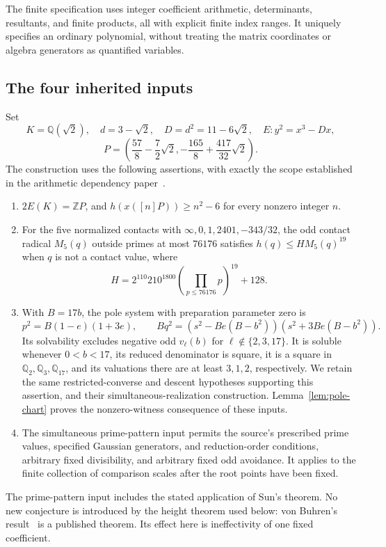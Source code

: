 \documentclass[11pt,a4paper]{article}
\newcommand{\Q}{\mathbb Q}\newcommand{\Z}{\mathbb Z}
\begin{document}
The finite specification uses integer coefficient arithmetic,
determinants, resultants, and finite
products, all with explicit finite index ranges. It uniquely
specifies an ordinary polynomial, without treating the matrix
coordinates or algebra generators as quantified variables.

\subsection{The four inherited inputs}\label{sec:inputs}

Set
\[
 K=\Q(\sqrt2),\quad d=3-\sqrt2,\quad D=d^2=11-6\sqrt2,
 \quad E:y^2=x^3-Dx,
\]
\[
 P=\left(\frac{57}{8}-\frac72\sqrt2,
          -\frac{165}{8}+\frac{417}{32}\sqrt2\right).
\]
The construction uses the following assertions, with exactly the
scope established in the arithmetic dependency paper~\cite{Dependencies}.
\begin{enumerate}
\item $2E(K)=\Z P$, and $h(x([n]P))\ge n^2-6$ for every
      nonzero integer $n$.
\item For the five normalized contacts with
      $\infty,0,1,2401,-343/32$, the odd contact radical
      $M_5(q)$ outside primes at most $76176$ satisfies
      $h(q)\le H M_5(q)^{19}$ when $q$ is not a contact value,
      where
\[
 H=2^{110}210^{1800}\left(\prod_{p\le76176}p\right)^{19}+128.
\]
\item With $B=17b$, the pole system with preparation parameter
      zero is
\[
 p^2=B(1-e)(1+3e),\qquad
 Bq^2=(s^2-Be(B-b^2))(s^2+3Be(B-b^2)).
\]
      Its solvability excludes negative odd $v_\ell(b)$ for
      $\ell\notin\{2,3,17\}$. It is soluble whenever
      $0<b<17$, its reduced denominator is square, it is a
      square in $\Q_2,\Q_3,\Q_{17}$, and its valuations there
      are at least $3,1,2$, respectively. We retain the same
      restricted-converse and descent hypotheses supporting this
      assertion, and their simultaneous-realization construction.
      Lemma~\ref{lem:pole-chart} proves the nonzero-witness
      consequence of these inputs.
\item The simultaneous prime-pattern input permits the source's
      prescribed prime values, specified Gaussian generators, and reduction-order
      conditions, arbitrary fixed divisibility, and arbitrary
      fixed odd avoidance. It applies to the finite collection
      of comparison scales after the root points have been fixed.
\end{enumerate}
The prime-pattern input includes the stated application of Sun's
theorem. No new conjecture is introduced by the height theorem
used below: von Buhren's result~\cite{VonBuhren} is a published
theorem. Its effect here is ineffectivity of one fixed coefficient.
\end{document}
